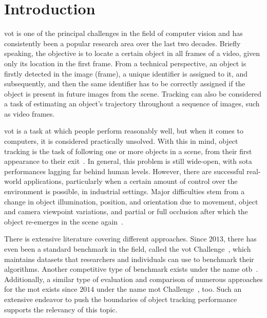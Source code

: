 \chapter{Introduction}
\label{chap:Introduction}

\Gls{vot} is one of the principal challenges in the field of computer vision and has consistently been a popular research area over the last two decades. Briefly speaking, the objective is to locate a certain object in all frames of a video, given only its location in the first frame. From a technical perspective, an object is firstly detected in the image (frame), a unique identifier is assigned to it, and subsequently, and then the same identifier has to be correctly assigned if the object is present in future images from the scene. Tracking can also be considered a task of estimating an object’s trajectory throughout a sequence of images, such as video frames.

\Gls{vot} is a task at which people perform reasonably well, but when it comes to computers, it is considered practically unsolved. With this in mind, object tracking is the task of following one or more objects in a scene, from their first appearance to their exit~\cite{forsyth2012computer}. In general, this problem is still wide-open, with \gls{sota} performances lagging far behind human levels. However, there are successful real-world applications, particularly when a certain amount of control over the environment is possible, \egtext{} in industrial settings. Major difficulties stem from a change in object illumination, position, and orientation due to movement, object and camera viewpoint variations, and partial or full occlusion after which the object re-emerges in the scene again~\cite{jalal2012sotavot}.

There is extensive literature covering different approaches. Since $2013$, there has even been a standard benchmark in the field, called the \gls{vot} Challenge~\cite{webvotchallenge}, which maintains datasets that researchers and individuals can use to benchmark their algorithms. Another competitive type of benchmark exists under the name \gls{otb}~\cite{wu2015otb}. Additionally, a similar type of evaluation and comparison of numerous approaches for the \gls{mot} exists since $2014$ under the name \gls{mot} Challenge~\cite{webmotchallenge}, too. Such an extensive endeavor to push the boundaries of object tracking performance supports the relevancy of this topic.

